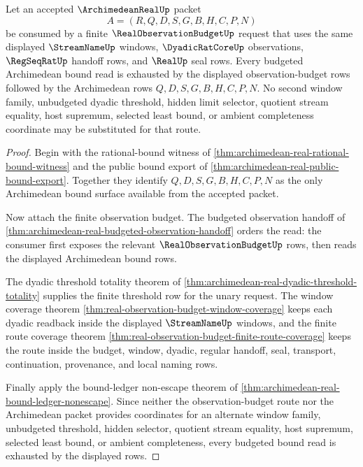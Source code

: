 \begin{theorem}
\label{thm:archimedean-real-budgeted-bound-window-exhaustion}
Let an accepted $\ArchimedeanRealUp$ packet
$$
A=(R,Q,D,S,G,B,H,C,P,N)
$$
be consumed by a finite $\RealObservationBudgetUp$ request that uses the same displayed $\StreamNameUp$ windows, $\DyadicRatCoreUp$ observations, $\RegSeqRatUp$ handoff rows, and $\RealUp$ seal rows. Every budgeted Archimedean bound read is exhausted by the displayed observation-budget rows followed by the Archimedean rows $Q,D,S,G,B,H,C,P,N$. No second window family, unbudgeted dyadic threshold, hidden limit selector, quotient stream equality, host supremum, selected least bound, or ambient completeness coordinate may be substituted for that route.
\end{theorem}
\begin{proof}
Begin with the rational-bound witness of \autoref{thm:archimedean-real-rational-bound-witness} and the public bound export of \autoref{thm:archimedean-real-public-bound-export}. Together they identify $Q,D,S,G,B,H,C,P,N$ as the only Archimedean bound surface available from the accepted packet.

Now attach the finite observation budget. The budgeted observation handoff of \autoref{thm:archimedean-real-budgeted-observation-handoff} orders the read: the consumer first exposes the relevant $\RealObservationBudgetUp$ rows, then reads the displayed Archimedean bound rows.

The dyadic threshold totality theorem of \autoref{thm:archimedean-real-dyadic-threshold-totality} supplies the finite threshold row for the unary request. The window coverage theorem \autoref{thm:real-observation-budget-window-coverage} keeps each dyadic readback inside the displayed $\StreamNameUp$ windows, and the finite route coverage theorem \autoref{thm:real-observation-budget-finite-route-coverage} keeps the route inside the budget, window, dyadic, regular handoff, seal, transport, continuation, provenance, and local naming rows.

Finally apply the bound-ledger non-escape theorem of \autoref{thm:archimedean-real-bound-ledger-nonescape}. Since neither the observation-budget route nor the Archimedean packet provides coordinates for an alternate window family, unbudgeted threshold, hidden selector, quotient stream equality, host supremum, selected least bound, or ambient completeness, every budgeted bound read is exhausted by the displayed rows.
\end{proof}

